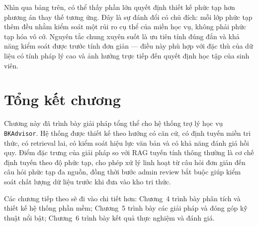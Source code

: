 \documentclass[../DoAn.tex]{subfiles}
\begin{document}
Nhìn qua bảng trên, có thể thấy phần lớn quyết định thiết kế phức tạp hơn
phương án thay thế tương ứng. Đây là sự đánh đổi có chủ đích: mỗi lớp phức
tạp thêm đều nhằm kiểm soát một rủi ro cụ thể của miền học vụ, không phải
phức tạp hóa vô cớ. Nguyên tắc chung xuyên suốt là ưu tiên tính đúng đắn và
khả năng kiểm soát được trước tính đơn giản --- điều này phù hợp với đặc thù
của dữ liệu có tính pháp lý cao và ảnh hưởng trực tiếp đến quyết định học tập
của sinh viên.

\section{Tổng kết chương}

Chương này đã trình bày giải pháp tổng thể cho hệ thống trợ lý học vụ
\texttt{BKAdvisor}. Hệ thống được thiết kế theo hướng có căn cứ, có định tuyến
miền tri thức, có retrieval lai, có kiểm soát hiệu lực văn bản và có khả năng
đánh giá hồi quy. Điểm đặc trưng của giải pháp so với RAG tuyến tính thông
thường là cơ chế định tuyến theo độ phức tạp, cho phép xử lý linh hoạt từ câu
hỏi đơn giản đến câu hỏi phức tạp đa nguồn, đồng thời bước admin review bắt buộc
giúp kiểm soát chất lượng dữ liệu trước khi đưa vào kho tri thức.

Các chương tiếp theo sẽ đi vào chi tiết hơn: Chương~4 trình bày phân tích và
thiết kế hệ thống phần mềm; Chương~5 trình bày các giải pháp và đóng góp kỹ
thuật nổi bật; Chương~6 trình bày kết quả thực nghiệm và đánh giá.
\end{document}

